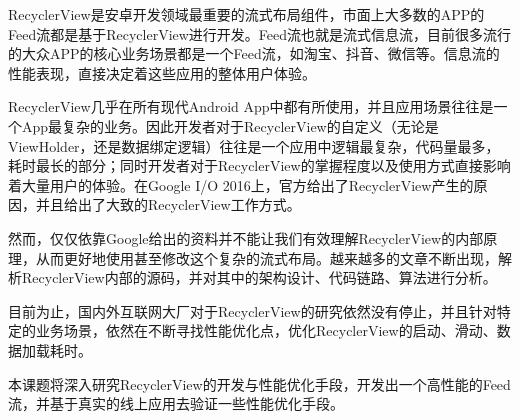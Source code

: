 RecyclerView\cite{test}是安卓开发领域最重要的流式布局组件，市面上大多数的APP的Feed流都是基于RecyclerView进行开发。Feed流也就是流式信息流，目前很多流行的大众APP的核心业务场景都是一个Feed流，如淘宝、抖音、微信等。信息流的性能表现，直接决定着这些应用的整体用户体验。

RecyclerView几乎在所有现代Android App中都有所使用，并且应用场景往往是一个App最复杂的业务。因此开发者对于RecyclerView的自定义（无论是ViewHolder，还是数据绑定逻辑）往往是一个应用中逻辑最复杂，代码量最多，耗时最长的部分；同时开发者对于RecyclerView的掌握程度以及使用方式直接影响着大量用户的体验。在Google I/O 2016上，官方给出了RecyclerView产生的原因，并且给出了大致的RecyclerView工作方式。

然而，仅仅依靠Google给出的资料并不能让我们有效理解RecyclerView的内部原理，从而更好地使用甚至修改这个复杂的流式布局。越来越多的文章不断出现，解析RecyclerView内部的源码，并对其中的架构设计、代码链路、算法进行分析。

目前为止，国内外互联网大厂对于RecyclerView的研究依然没有停止，并且针对特定的业务场景，依然在不断寻找性能优化点，优化RecyclerView的启动、滑动、数据加载耗时。

本课题将深入研究RecyclerView的开发与性能优化手段，开发出一个高性能的Feed流，并基于真实的线上应用去验证一些性能优化手段。
